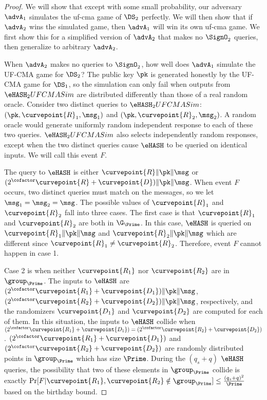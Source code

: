 \begin{proof}
	We will show that except with some small probability, our adversary $\advA_1$ simulates the uf-cma game of $\DS_2$ perfectly. We will then show that if $\advA_2$ wins the simulated game, then $\advA_1$ will win its own uf-cma game. We first show this for a simplified version of $\advA_2$ that makes no $\SignO_2$ queries, then generalize to arbitrary $\advA_2$. 
	
	When $\advA_2$ makes no queries to $\SignO_2$, how well does $\advA_1$ simulate the UF-CMA game for $\DS_2$? The public key $\pk$ is generated honestly by the UF-CMA game for $\DS_1$, so the simulation can only fail when outputs from $\eHASH_2UFCMASim$ are distributed differently than those of a real random oracle. Consider two distinct queries to $\eHASH_2UFCMASim$: $(\pk, \curvepoint{R}_1, \msg_1)$ and $(\pk, \curvepoint{R}_2, \msg_2)$. A random oracle would generate uniformly random independent response to each of these two queries. $\eHASH_2UFCMASim$ also selects independently random responses, except when the two distinct queries cause $\eHASH$ to be queried on identical inputs. We will call this event $F$. 
	
	The query to $\eHASH$ is either $\curvepoint{R}\|\pk\|\msg$ or $(2^\cofactor\curvepoint{R} + \curvepoint{D})\|\pk\|\msg$. When event $F$ occurs, two distinct queries must match on the messages, so we let $\msg_1 = \msg_2 = \msg$. The possible values of $\curvepoint{R}_1$ and $\curvepoint{R}_2$ fall into three cases. The first case is that $\curvepoint{R}_1$ and $\curvepoint{R}_2$ are both in $\G_\Prime$. In this case, $\eHASH$ is queried on $\curvepoint{R}_1\|\pk\|\msg$ and $\curvepoint{R}_2\|\pk\|\msg$ which are different since $\curvepoint{R}_1 \neq \curvepoint{R}_2$. Therefore, event $F$ cannot happen in case 1. 
	
	Case 2 is when neither $\curvepoint{R_1}$ nor $\curvepoint{R_2}$ are  in $\group_{\Prime}$. The inputs to $\eHASH$ are $(2^\cofactor\curvepoint{R_1} + \curvepoint{D_1})\|\pk\|\msg$, 
	$(2^\cofactor\curvepoint{R_2} + \curvepoint{D_2})\|\pk\|\msg$, respectively, and the randomizers $\curvepoint{D_1}$ and $\curvepoint{D_2}$ are computed for each of them. In this situation, the inputs to $\eHASH$ collide when $(2^\cofactor\curvepoint{R_1} + \curvepoint{D_1}) = (2^\cofactor\curvepoint{R_2} + \curvepoint{D_2})$. $(2^\cofactor\curvepoint{R_1} + \curvepoint{D_1})$ and $(2^\cofactor\curvepoint{R_2} + \curvepoint{D_2})$ are randomly distributed points in $\group_{\Prime}$ which has size $\Prime$. During the $(q_s + q)$ $\eHASH$ queries, the possibility that two of these elements in $\group_{\Prime}$ collide is exactly $\Pr[F | \curvepoint{R_1}, \curvepoint{R_2} \notin \group_{\Prime}] \leq \frac{(q_s + q)^2}{\Prime}$ based on the birthday bound.
	

\end{proof}
